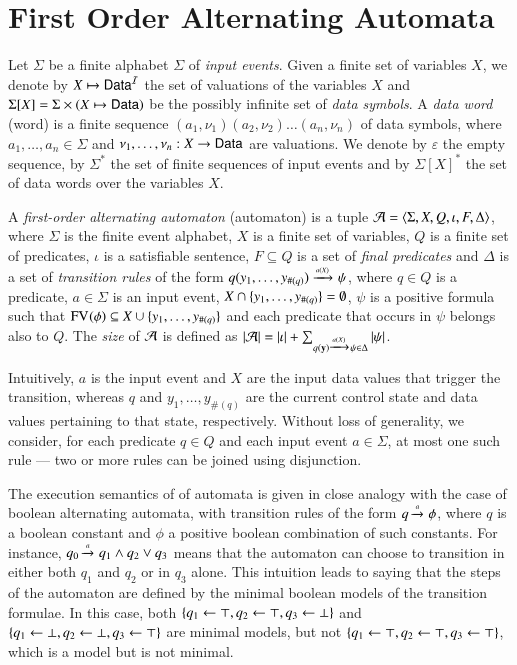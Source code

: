 \documentclass{llncs}
\begin{document}
\section{First Order Alternating Automata}

Let $\Sigma$ be a finite alphabet $\Sigma$ of \emph{input
  events}. Given a finite set of variables $X$, we denote by $X
\mapsto \mathsf{Data}^{\mathcal{I}}$ the set of valuations of the variables $X$ and
$\Sigma[X] = \Sigma \times (X \mapsto \mathsf{Data})$ be the possibly infinite
set of \emph{data symbols}. A \emph{data word} (word) is a finite
sequence $(a_1,\nu_1)(a_2,\nu_2) \ldots (a_n,\nu_n)$ of data symbols,
where $a_1,\ldots,a_n \in \Sigma$ and $\nu_1,\ldots,\nu_n : X
\rightarrow \mathsf{Data}$ are valuations. We denote by $\varepsilon$ the
empty sequence, by $\Sigma^*$ the set of finite sequences of input
events and by $\Sigma[X]^*$ the set of data words over the variables
$X$.

A \emph{first-order alternating automaton} (automaton) is a tuple $\mathcal{A}
= \langle \Sigma,X,Q,\iota,F,\Delta \rangle$, where $\Sigma$ is the finite
event alphabet, $X$ is a finite set of variables, $Q$ is a finite set
of predicates, $\iota$ is a satisfiable sentence, $F \subseteq Q$ is a
set of \emph{final predicates} and $\Delta$ is a set of
\emph{transition rules} of the form \(q(y_1,\ldots,y_{\#(q)})
\xrightarrow{{\scriptscriptstyle a(X)}}_{{\scriptstyle }} \psi\), where $q \in Q$ is a predicate, $a \in \Sigma$
is an input event, $X \cap \{ y_1,\ldots,y_{\#(q)} \} = \emptyset$,
$\psi$ is a positive formula such that $\mathrm{FV}_{}(\phi) \subseteq X \cup
\{ y_1,\ldots,y_{\#(q)} \}$ and each predicate that occurs in $\psi$
belongs also to $Q$. The \emph{size} of $\mathcal{A}$ is defined as ${|{\mathcal{A}}|} =
{|{\iota}|} + \sum_{q(\mathbf y) \xrightarrow{{\scriptscriptstyle a(X)}}_{{\scriptstyle }} \psi \in \Delta}
{|{\psi}|}$.

Intuitively, $a$ is the input event and $X$ are the input data values
that trigger the transition, whereas $q$ and $y_1,\ldots,y_{\#(q)}$
are the current control state and data values pertaining to that
state, respectively. Without loss of generality, we consider, for each
predicate $q \in Q$ and each input event $a \in \Sigma$, at most one
such rule --- two or more rules can be joined using disjunction.

The execution semantics of of automata is given in close analogy with
the case of boolean alternating automata, with transition rules of the
form $q \xrightarrow{{\scriptscriptstyle a}}_{{\scriptstyle }} \phi$, where $q$ is a boolean constant and $\phi$
a positive boolean combination of such constants. For instance, $q_0
\xrightarrow{{\scriptscriptstyle a}}_{{\scriptstyle }} q_1 \wedge q_2 \vee q_3$ means that the automaton can
choose to transition in either both $q_1$ and $q_2$ or in $q_3$
alone. This intuition leads to saying that the steps of the automaton
are defined by the minimal boolean models of the transition
formulae. In this case, both $\{ q_1 \leftarrow \top, q_2 \leftarrow
  \top, q_3 \leftarrow \bot \}$ and $\{ q_1 \leftarrow \bot, q_2
  \leftarrow \bot, q_3 \leftarrow \top \}$ are minimal models, but not
$\{ q_1 \leftarrow \top, q_2 \leftarrow \top, q_3 \leftarrow \top \}$,
which is a model but is not minimal.
\end{document}
